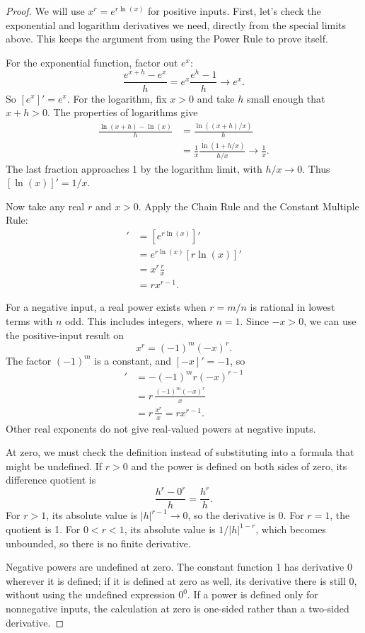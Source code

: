 \begin{proof}
We will use $x^r=e^{r\ln(x)}$ for positive inputs. First, let's check
the exponential and logarithm derivatives we need, directly from the
special limits above. This keeps the argument from using the Power Rule
to prove itself.

For the exponential function, factor out $e^x$:
$$
\frac{e^{x+h}-e^x}h
=e^x\frac{e^h-1}h\longrightarrow e^x.
$$
So $[e^x]'=e^x$. For the logarithm, fix $x>0$ and take $h$ small
enough that $x+h>0$. The properties of logarithms give
\begin{align*}
\frac{\ln(x+h)-\ln(x)}h
&=\frac{\ln((x+h)/x)}h\\
&=\frac1x\frac{\ln(1+h/x)}{h/x}\longrightarrow\frac1x.
\end{align*}
The last fraction approaches 1 by the logarithm limit, with $h/x\to0$.
Thus $[\ln(x)]'=1/x$.

Now take any real $r$ and $x>0$. Apply the Chain Rule and the
Constant Multiple Rule:
\begin{align*}
[x^r]'
&=[e^{r\ln(x)}]'\\
&=e^{r\ln(x)}[r\ln(x)]'\\
&=x^r\frac rx\\
&=rx^{r-1}.
\end{align*}

For a negative input, a real power exists when $r=m/n$ is rational in
lowest terms with $n$ odd. This includes integers, where $n=1$.
Since $-x>0$, we can use the positive-input result on
$$x^r=(-1)^m(-x)^r.$$
The factor $(-1)^m$ is a constant, and $[-x]'=-1$, so
\begin{align*}
[x^r]'
&=-(-1)^m r(-x)^{r-1}\\
&=r\,\frac{(-1)^m(-x)^r}{x}\\
&=r\,\frac{x^r}{x}=rx^{r-1}.
\end{align*}
Other real exponents do not give real-valued powers at negative inputs.

At zero, we must check the definition instead of substituting into a
formula that might be undefined. If $r>0$ and the power is defined on
both sides of zero, its difference quotient is
$$\frac{h^r-0^r}h=\frac{h^r}h.$$
For $r>1$, its absolute value is $|h|^{r-1}\to0$, so the derivative is 0.
For $r=1$, the quotient is 1. For $0<r<1$, its absolute value is
$1/|h|^{1-r}$, which becomes unbounded, so there is no finite derivative.

Negative powers are undefined at zero. The constant function 1 has
derivative 0 wherever it is defined; if it is defined at zero as well,
its derivative there is still 0, without using the undefined expression
$0^0$. If a power is defined only for nonnegative inputs, the calculation
at zero is one-sided rather than a two-sided derivative.
\end{proof}

